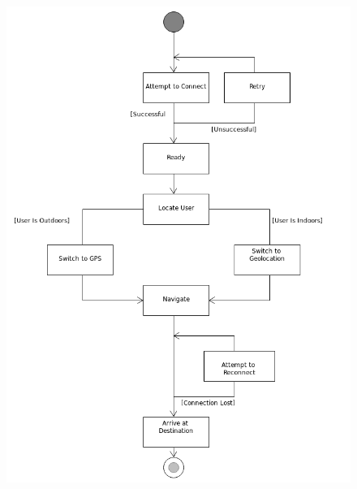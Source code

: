 \documentclass{article}
\begin{document}
	\begin{figure}[h]
  		\includegraphics[width=\textwidth]{Images/NavigationState.png}
	\end{figure}
	\FloatBarrier	
\end{document}
